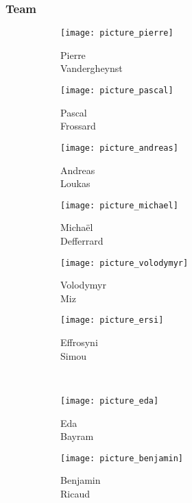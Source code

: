\documentclass[aspectratio=169]{beamer}
\begin{document}

\begin{frame}
	\frametitle{Team}
	\begin{figure}
		\centering
		\captionsetup{justification=centering}
		\begin{subfigure}[b]{0.14\linewidth}
			\texttt{[image: picture\_pierre]}
			\caption*{Pierre\\Vandergheynst}
		\end{subfigure}
		\hfill
		\begin{subfigure}[b]{0.14\linewidth}
			\texttt{[image: picture\_pascal]}
			\caption*{Pascal\\Frossard}
		\end{subfigure}
		\hfill
		\begin{subfigure}[b]{0.14\linewidth}
			\texttt{[image: picture\_andreas]}
			\caption*{Andreas\\Loukas}
		\end{subfigure}
		\hfill
		\begin{subfigure}[b]{0.14\linewidth}
			\texttt{[image: picture\_michael]}
			\caption*{Michaël\\Defferrard}
		\end{subfigure}
		\hfill
		\begin{subfigure}[b]{0.14\linewidth}
			\texttt{[image: picture\_volodymyr]}
			\caption*{Volodymyr\\Miz}
		\end{subfigure}
		\hfill
		\begin{subfigure}[b]{0.14\linewidth}
			\texttt{[image: picture\_ersi]}
			\caption*{Effrosyni\\Simou}
		\end{subfigure}
		\\
		\vspace{1em}
		\begin{subfigure}[b]{0.14\linewidth}
			\texttt{[image: picture\_eda]}
			\caption*{Eda\\Bayram}
		\end{subfigure}
		\hfill
		\begin{subfigure}[b]{0.14\linewidth}
			\texttt{[image: picture\_benjamin]}
			\caption*{Benjamin\\Ricaud}
		\end{subfigure}
		\hfill
		\begin{subfigure}[b]{0.14\linewidth}

\end{subfigure}
\end{figure}
\end{frame}
\end{document}
